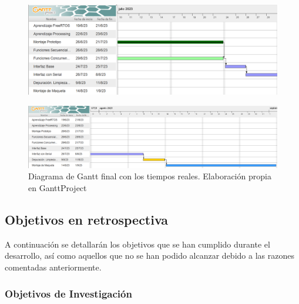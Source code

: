 \begin{figure}[H]
    \centering
    \includegraphics[width=1\textwidth]{imagenes/gantt_final_p2.png}
\end{figure}



\begin{figure}[H]
    \centering
    \includegraphics[width=1\textwidth]{imagenes/gantt_final_p3.png}
    \caption{Diagrama de Gantt  final con los tiempos reales. Elaboración propia en GanttProject}
\end{figure}

\subsection{Objetivos en retrospectiva}

A continuación se detallarán los objetivos que se han cumplido durante el desarrollo, así como aquellos que no se han podido alcanzar debido a las razones comentadas anteriormente. 


\subsubsection*{Objetivos de Investigación}


